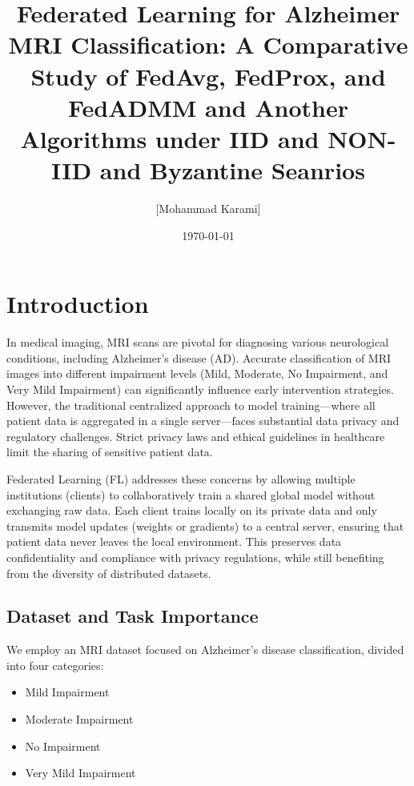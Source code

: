 \documentclass[12pt,a4paper]{report}
\begin{document}
	
	\title{Federated Learning for Alzheimer MRI Classification: A Comparative Study of FedAvg, FedProx, and FedADMM  and  Another Algorithms under IID  and  NON-IID and  Byzantine Seanrios}
	\author{[Mohammad Karami]}
	\date{\today}
	\maketitle
	
	\tableofcontents
	
	

\chapter{Introduction}

In medical imaging, MRI scans are pivotal for diagnosing various neurological conditions, including Alzheimer's disease (AD). Accurate classification of MRI images into different impairment levels (Mild, Moderate, No Impairment, and Very Mild Impairment) can significantly influence early intervention strategies. However, the traditional centralized approach to model training—where all patient data is aggregated in a single server—faces substantial data privacy and regulatory challenges. Strict privacy laws and ethical guidelines in healthcare limit the sharing of sensitive patient data.

Federated Learning (FL) addresses these concerns by allowing multiple institutions (clients) to collaboratively train a shared global model without exchanging raw data. Each client trains locally on its private data and only transmits model updates (weights or gradients) to a central server, ensuring that patient data never leaves the local environment. This preserves data confidentiality and compliance with privacy regulations, while still benefiting from the diversity of distributed datasets.

\section{Dataset and Task Importance}

We employ an MRI dataset focused on Alzheimer’s disease classification, divided into four categories:
\begin{itemize}
	\item Mild Impairment
	\item Moderate Impairment
	\item No Impairment
	\item Very Mild Impairment
\end{itemize}
\end{document}
